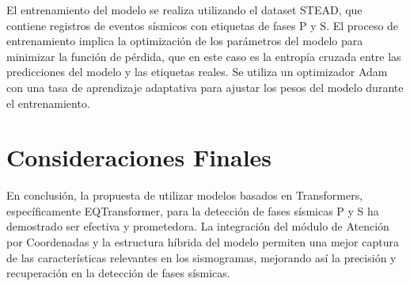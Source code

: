 El entrenamiento del modelo se realiza utilizando el dataset STEAD, que contiene registros de eventos sísmicos con etiquetas de fases P y S. El proceso de entrenamiento implica la optimización de los parámetros del modelo para minimizar la función de pérdida, que en este caso es la entropía cruzada entre las predicciones del modelo y las etiquetas reales. Se utiliza un optimizador Adam con una tasa de aprendizaje adaptativa para ajustar los pesos del modelo durante el entrenamiento.

\section{Consideraciones Finales}

En conclusión, la propuesta de utilizar modelos basados en Transformers, específicamente EQTransformer, para la detección de fases sísmicas P y S ha demostrado ser efectiva y prometedora. La integración del módulo de Atención por Coordenadas y la estructura híbrida del modelo permiten una mejor captura de las características relevantes en los sismogramas, mejorando así la precisión y recuperación en la detección de fases sísmicas.

